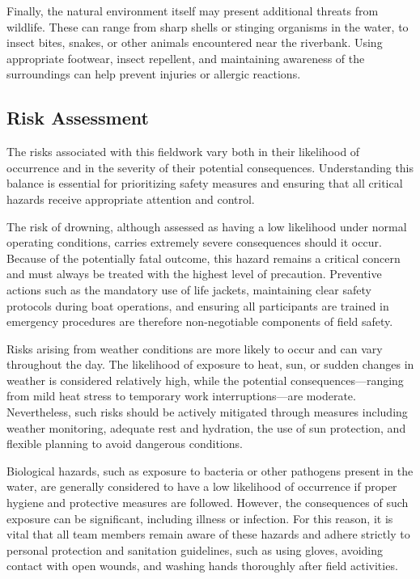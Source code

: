Finally, the natural environment itself may present additional threats from wildlife. These can range from sharp shells or stinging organisms in the water, to insect bites, snakes, or other animals encountered near the riverbank. Using appropriate footwear, insect repellent, and maintaining awareness of the surroundings can help prevent injuries or allergic reactions.


\subsection{Risk Assessment}
The risks associated with this fieldwork vary both in their likelihood of occurrence and in the severity of their potential consequences. Understanding this balance is essential for prioritizing safety measures and ensuring that all critical hazards receive appropriate attention and control.

The risk of drowning, although assessed as having a low likelihood under normal operating conditions, carries extremely severe consequences should it occur. Because of the potentially fatal outcome, this hazard remains a critical concern and must always be treated with the highest level of precaution. Preventive actions such as the mandatory use of life jackets, maintaining clear safety protocols during boat operations, and ensuring all participants are trained in emergency procedures are therefore non-negotiable components of field safety.

Risks arising from weather conditions are more likely to occur and can vary throughout the day. The likelihood of exposure to heat, sun, or sudden changes in weather is considered relatively high, while the potential consequences—ranging from mild heat stress to temporary work interruptions—are moderate. Nevertheless, such risks should be actively mitigated through measures including weather monitoring, adequate rest and hydration, the use of sun protection, and flexible planning to avoid dangerous conditions.

Biological hazards, such as exposure to bacteria or other pathogens present in the water, are generally considered to have a low likelihood of occurrence if proper hygiene and protective measures are followed. However, the consequences of such exposure can be significant, including illness or infection. For this reason, it is vital that all team members remain aware of these hazards and adhere strictly to personal protection and sanitation guidelines, such as using gloves, avoiding contact with open wounds, and washing hands thoroughly after field activities.

